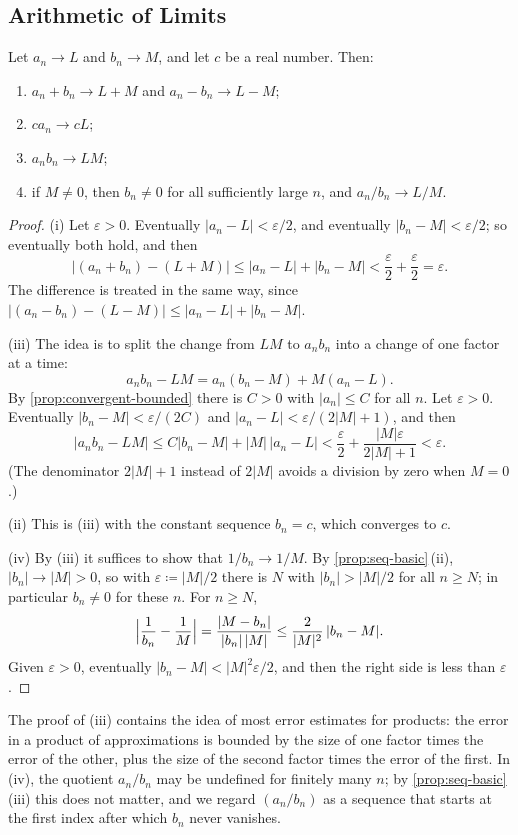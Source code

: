 \subsection{Arithmetic of Limits}

\begin{theorem}
\label{thm:limit-laws}
Let $a_n\to L$ and $b_n\to M$, and let $c$ be a real number. Then:
\begin{enumerate}
\item $a_n+b_n\to L+M$ and $a_n-b_n\to L-M$;
\item $ca_n\to cL$;
\item $a_nb_n\to LM$;
\item if $M\ne0$, then $b_n\ne0$ for all sufficiently large $n$, and $a_n/b_n\to L/M$.
\end{enumerate}
\end{theorem}

\begin{proof}
(i) Let $\varepsilon>0$. Eventually $|a_n-L|<\varepsilon/2$, and eventually $|b_n-M|<\varepsilon/2$; so eventually both hold, and then
\[
|(a_n+b_n)-(L+M)|\le|a_n-L|+|b_n-M|<\frac\varepsilon2+\frac\varepsilon2=\varepsilon .
\]
The difference is treated in the same way, since $|(a_n-b_n)-(L-M)|\le|a_n-L|+|b_n-M|$.

(iii) The idea is to split the change from $LM$ to $a_nb_n$ into a change of one factor at a time:
\[
a_nb_n-LM=a_n(b_n-M)+M(a_n-L).
\]
By \cref{prop:convergent-bounded} there is $C>0$ with $|a_n|\le C$ for all $n$. Let $\varepsilon>0$. Eventually $|b_n-M|<\varepsilon/(2C)$ and $|a_n-L|<\varepsilon/(2|M|+1)$, and then
\[
|a_nb_n-LM|\le C|b_n-M|+|M|\,|a_n-L|<\frac\varepsilon2+\frac{|M|\varepsilon}{2|M|+1}<\varepsilon .
\]
(The denominator $2|M|+1$ instead of $2|M|$ avoids a division by zero when $M=0$.)

(ii) This is (iii) with the constant sequence $b_n=c$, which converges to $c$.

(iv) By (iii) it suffices to show that $1/b_n\to1/M$. By \cref{prop:seq-basic}\,(ii), $|b_n|\to|M|>0$, so with $\varepsilon\coloneqq|M|/2$ there is $N$ with $|b_n|>|M|/2$ for all $n\ge N$; in particular $b_n\ne0$ for these $n$. For $n\ge N$,
\[
\Bigl|\frac1{b_n}-\frac1M\Bigr|=\frac{|M-b_n|}{|b_n|\,|M|}\le\frac{2}{|M|^2}\,|b_n-M| .
\]
Given $\varepsilon>0$, eventually $|b_n-M|<|M|^2\varepsilon/2$, and then the right side is less than $\varepsilon$.
\end{proof}

The proof of (iii) contains the idea of most error estimates for products: the error in a product of approximations is bounded by the size of one factor times the error of the other, plus the size of the second factor times the error of the first. In (iv), the quotient $a_n/b_n$ may be undefined for finitely many $n$; by \cref{prop:seq-basic}\,(iii) this does not matter, and we regard $(a_n/b_n)$ as a sequence that starts at the first index after which $b_n$ never vanishes.

